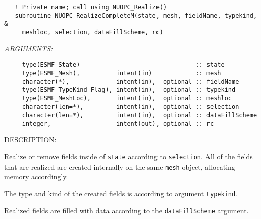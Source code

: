 \begin{verbatim}   ! Private name; call using NUOPC_Realize()
   subroutine NUOPC_RealizeCompleteM(state, mesh, fieldName, typekind, &
     meshloc, selection, dataFillScheme, rc)\end{verbatim}{\em ARGUMENTS:}
\begin{verbatim}     type(ESMF_State)                                :: state
     type(ESMF_Mesh),          intent(in)            :: mesh
     character(*),             intent(in),  optional :: fieldName
     type(ESMF_TypeKind_Flag), intent(in),  optional :: typekind
     type(ESMF_MeshLoc),       intent(in),  optional :: meshloc
     character(len=*),         intent(in),  optional :: selection
     character(len=*),         intent(in),  optional :: dataFillScheme    
     integer,                  intent(out), optional :: rc\end{verbatim}
{\sf DESCRIPTION:\\ }


     \label{NUOPC_RealizeCompleteM}
  
     Realize or remove fields inside of {\tt state} according to {\tt selection}.
     All of the fields that are realized are created internally on the same 
     {\tt mesh} object, allocating memory accordingly.
  
     The type and kind of the created fields is according to argument 
     {\tt typekind}.
  
     Realized fields are filled with data according to the {\tt dataFillScheme}
     argument.
  
